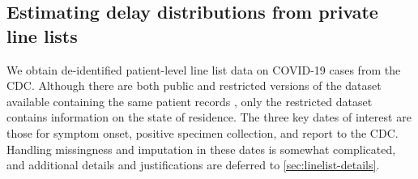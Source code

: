 \documentclass{article}
\begin{document}







\subsection{Estimating delay distributions from private line lists}
\label{sec:delaystop}

We obtain de-identified patient-level line list data on COVID-19 cases from the
CDC. Although there are both public and restricted versions of the dataset
available containing the same patient records \citep{cdc2020casepub,
cdc2020caserestr}, only the restricted dataset contains information on the state
of residence. The three key dates of interest are those for symptom onset,
positive specimen collection, and report to the CDC. Handling missingness and
imputation in these dates is somewhat complicated, and additional details and
justifications are deferred to \autoref{sec:linelist-details}.
\end{document}
